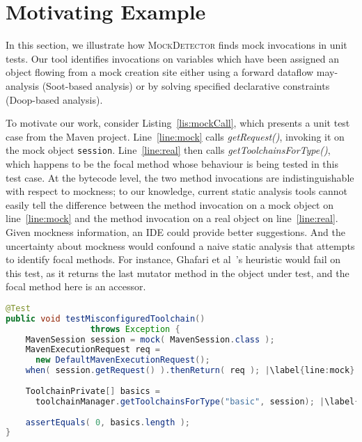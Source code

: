\section{Motivating Example}
\label{sec:motivating-example}

In this section, we illustrate how \textsc{MockDetector} finds mock invocations in unit tests. Our tool identifies invocations on variables which have been assigned an object flowing from a mock creation site either using a forward dataflow may-analysis (Soot-based analysis) or by solving specified declarative constraints (Doop-based analysis).

To motivate our work, consider Listing~\ref{lis:mockCall}, which presents a unit test case from the Maven project. Line~\ref{line:mock} calls \textit{getRequest()}, invoking it on the mock object \texttt{session}. Line~\ref{line:real} then calls \textit{getToolchainsForType()}, which happens to be the focal method whose behaviour is being tested in this test case. At the bytecode level, the two method invocations are indistinguishable with respect to mockness; to our knowledge, current static analysis tools cannot easily tell the difference between the method invocation on a mock object on line~\ref{line:mock} and the method invocation on a real object on line~\ref{line:real}. Given mockness information, an IDE could provide better suggestions. And the uncertainty about mockness would confound a naive static analysis that attempts to identify focal methods. For instance, Ghafari et al~\cite{ghafari15:_autom}'s heuristic would fail on this test, as it returns the last mutator method in the object under test, and the focal method here is an accessor. 

\begin{lstlisting}[basicstyle=\ttfamily, caption={This code snippet illustrates an example from maven-core, where calls to both the focal method \texttt{getToolchainsForType()} and to mock \texttt{session}'s \texttt{getRequest()} method occur in test \textit{testMisconfiguredToolchain()}.},
basicstyle=\scriptsize\ttfamily,language = Java, framesep=4.5mm, escapechar=|,
framexleftmargin=1.0mm, captionpos=b, label=lis:mockCall, morekeywords={@Test}]
@Test
public void testMisconfiguredToolchain()
                 throws Exception {
    MavenSession session = mock( MavenSession.class );
    MavenExecutionRequest req = 
      new DefaultMavenExecutionRequest();
    when( session.getRequest() ).thenReturn( req ); |\label{line:mock}|
    
    ToolchainPrivate[] basics =
      toolchainManager.getToolchainsForType("basic", session); |\label{line:real}|
    
    assertEquals( 0, basics.length );
}
\end{lstlisting}

